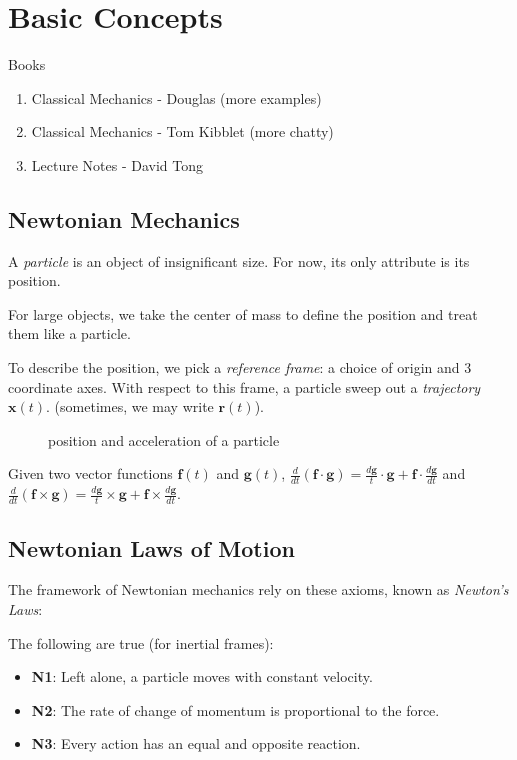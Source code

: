 \section{Basic Concepts}
Books
\begin{enumerate}
    \item Classical Mechanics - Douglas (more examples)
    \item Classical Mechanics - Tom Kibblet (more chatty)
    \item Lecture Notes - David Tong
\end{enumerate}
\subsection{Newtonian Mechanics}
A \textit{particle} is an object of insignificant size. For now, its only attribute is its position.

For large objects, we take the center of mass to define the position and treat them like a particle.

To describe the position, we pick a \textit{reference frame}: a choice of origin and 3 coordinate axes. With respect to this frame, a particle sweep out a \textit{trajectory} $\mathbf{x} (t).$ (sometimes, we may write $\mathbf{r} (t)$).

\begin{figure}[H]
    \centering
    \caption{position and acceleration of a particle}
    \label{fig:va}
\end{figure}

Given two vector functions $\mathbf{f}(t)$ and $\mathbf{g} (t)$, $\frac{d}{dt}(\mathbf{f} \cdot \mathbf{g} ) = \frac{d \mathbf{g} }{t}\cdot \mathbf{g}  + \mathbf{f}  \cdot \frac{d \mathbf{g} }{dt}$ and $\frac{d}{dt}(\mathbf{f} \times \mathbf{g} ) = \frac{d \mathbf{g} }{t}\times \mathbf{g}  + \mathbf{f}  \times \frac{d \mathbf{g} }{dt}$.

\subsection{Newtonian Laws of Motion}
The framework of Newtonian mechanics rely on these axioms, known as \textit{Newton's Laws}:
\begin{definition}
    The following are true (for inertial frames):
\begin{itemize}
    \item \textbf{N1}: Left alone, a particle moves with constant velocity.
    \item \textbf{N2}: The rate of change of momentum is proportional to the force.
    \item \textbf{N3}: Every action has an equal and opposite reaction.
\end{itemize}
\end{definition}
